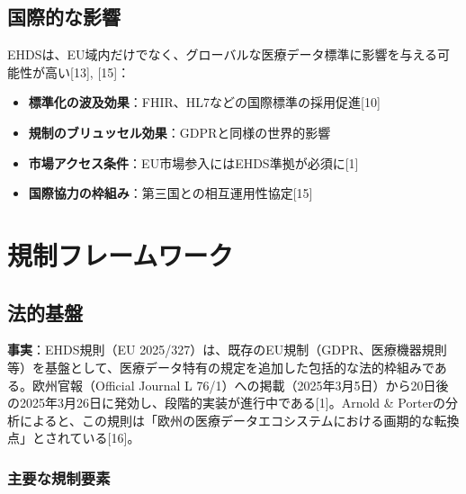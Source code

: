\documentclass[
  a4paper,
  a4paper,
  11pt]{ltjsbook}
\providecommand{\tightlist}{%
  \setlength{\itemsep}{0pt}\setlength{\parskip}{0pt}}
\begin{document}
\section{国際的な影響}\label{ux56fdux969bux7684ux306aux5f71ux97ff}

EHDSは、EU域内だけでなく、グローバルな医療データ標準に影響を与える可能性が高い{[}13{]},
{[}15{]}：

\begin{itemize}
\tightlist
\item
  \textbf{標準化の波及効果}：FHIR、HL7などの国際標準の採用促進{[}10{]}
\item
  \textbf{規制のブリュッセル効果}：GDPRと同様の世界的影響
\item
  \textbf{市場アクセス条件}：EU市場参入にはEHDS準拠が必須に{[}1{]}
\item
  \textbf{国際協力の枠組み}：第三国との相互運用性協定{[}15{]}
\end{itemize}

\chapter{規制フレームワーク}\label{ux898fux5236ux30d5ux30ecux30fcux30e0ux30efux30fcux30af}

\section{法的基盤}\label{ux6cd5ux7684ux57faux76e4}

\textbf{事実}：EHDS規則（EU
2025/327）は、既存のEU規制（GDPR、医療機器規則等）を基盤として、医療データ特有の規定を追加した包括的な法的枠組みである。欧州官報（Official
Journal L
76/1）への掲載（2025年3月5日）から20日後の2025年3月26日に発効し、段階的実装が進行中である{[}1{]}。Arnold
\&
Porterの分析によると、この規則は「欧州の医療データエコシステムにおける画期的な転換点」とされている{[}16{]}。

\subsection{主要な規制要素}\label{ux4e3bux8981ux306aux898fux5236ux8981ux7d20}
\end{document}
